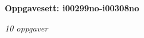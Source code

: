 \centerline{\bf Oppgavesett: i00299no-i00308no}
\vskip 10pt
\centerline{\it 10 oppgaver}\vskip 10pt
\vskip 10pt
